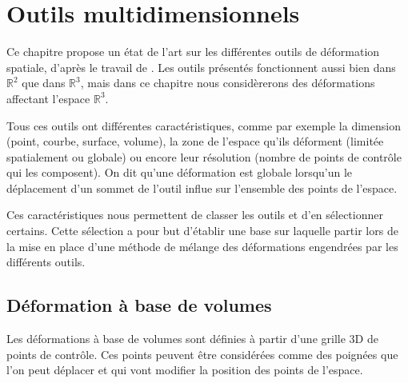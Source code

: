 

\chapter{Outils multidimensionnels}

\graphicspath{{Chapter1/Chapter1Figs/PNG/}{Chapter1/Chapter1Figs/PDF/}{Chapter1/Chapter1Figs/}}

Ce chapitre propose un état de l'art sur les différentes outils de déformation
spatiale, d'après le travail de \cite{GB08}. Les outils présentés
fonctionnent aussi bien dans $\mathbb{R}^2$ que dans $\mathbb{R}^3$, mais dans
ce chapitre nous considèrerons des déformations affectant l'espace
$\mathbb{R}^3$.

Tous ces outils ont différentes caractéristiques, comme par exemple la dimension
(point, courbe, surface, volume), la zone de l'espace qu'ils déforment (limitée
spatialement ou globale) ou encore leur résolution (nombre de points de contrôle
qui les composent). On dit qu'une déformation est globale lorsqu'un le
déplacement d'un sommet de l'outil influe sur l'ensemble des points de l'espace.

Ces caractéristiques nous permettent de classer les outils et d'en sélectionner
certains. Cette sélection a pour but d'établir une base sur laquelle partir lors
de la mise en place d'une méthode de mélange des déformations engendrées par les
différents outils.

\section{Déformation à base de volumes}

Les déformations à base de volumes sont définies à partir d'une grille 3D de
points de contrôle. Ces points peuvent être considérées comme des poignées que
l'on peut déplacer et qui vont modifier la position des points de l'espace.


